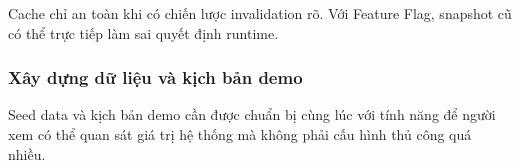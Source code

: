 Cache chỉ an toàn khi có chiến lược invalidation rõ. Với Feature Flag, snapshot cũ có thể trực tiếp làm sai quyết định runtime.

\subsubsection{Xây dựng dữ liệu và kịch bản demo}

Seed data và kịch bản demo cần được chuẩn bị cùng lúc với tính năng để người xem có thể quan sát giá trị hệ thống mà không phải cấu hình thủ công quá nhiều.
